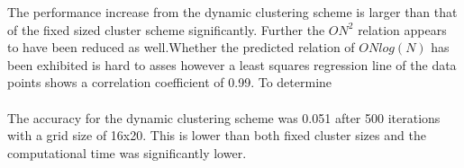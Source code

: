 The performance increase from the dynamic clustering scheme is larger than that of the fixed sized cluster scheme significantly. Further the $ON^2$ relation appears to have been reduced as well.Whether the predicted relation of $ONlog(N)$ has been exhibited is hard to asses however a least squares regression line of the data points shows a correlation coefficient of 0.99. To determine 
\\\\
The accuracy for the dynamic clustering scheme was 0.051 after 500 iterations with a grid size of 16x20. This is lower than both fixed cluster sizes and the computational time was significantly lower. 
